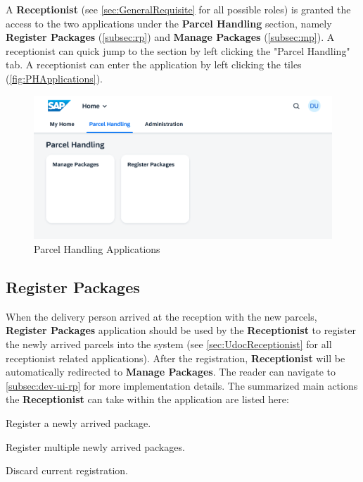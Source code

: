 A \textbf{Receptionist} (see \autoref{sec:GeneralRequisite} for all possible roles) is granted the access to the two applications under the \textbf{Parcel Handling} section, namely \textbf{Register Packages} (\autoref{subsec:rp}) and \textbf{Manage Packages} (\autoref{subsec:mp}). A receptionist can quick jump to the section by left clicking the "Parcel Handling" tab. A receptionist can enter the application by left clicking the tiles (\autoref{fig:PHApplications}).

\begin{figure}[htb!]
	\centering
	\includegraphics[width=0.85\linewidth]{images/user_doc/overviews/ParcelHandlingTab.png}
	\caption{Parcel Handling Applications}
	\label{fig:PHApplications}
\end{figure}


\subsection{Register Packages}
\label{subsec:rp}

When the delivery person arrived at the reception with the new parcels, \textbf{Register Packages} application should be used by the \textbf{Receptionist} to register the newly arrived parcels into the system (see \autoref{sec:UdocReceptionist} for all receptionist related applications). After the registration, \textbf{Receptionist} will be automatically redirected to \textbf{Manage Packages}. The reader can navigate to \autoref{subsec:dev-ui-rp} for more implementation details. 
The summarized main actions the \textbf{Receptionist} can take within the application are listed here:

\begin{compactenum}
	\item Register a newly arrived package.
    \item Register multiple newly arrived packages.
    \item Discard current registration.
\end{compactenum}

